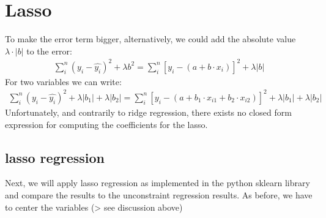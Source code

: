 \documentclass[letterpaper,10pt,english]{jupyterBook}
\begin{document}
\section{Lasso}
\label{\detokenize{Regression_Techniques:lasso}}
\sphinxAtStartPar
To make the error term bigger, alternatively, we could add the absolute value \(\lambda\cdot |b|\) to the error:
\begin{equation*}
\begin{split}\sum_i^{n}(y_i - \hat{y_i})^2 + \lambda b^2= \sum_i^{n}[y_i - (a + b\cdot x_i)]^{2}+ \lambda |b|\end{split}
\end{equation*}
\sphinxAtStartPar
For two variables we can write:
\begin{equation*}
\begin{split}\sum_i^{n}(y_i - \hat{y_i})^2 + \lambda |b_1| + \lambda |b_2|= \sum_i^{n}[y_i - (a + b_1\cdot x_{i1} + b_2\cdot x_{i2})]^{2}+ \lambda |b_1| + \lambda |b_2|\end{split}
\end{equation*}
\sphinxAtStartPar
Unfortunately, and contrarily to ridge regression, there exists no closed form expression for computing the coefficients for the lasso.


\subsection{lasso regression}
\label{\detokenize{Regression_Techniques:lasso-regression}}
\sphinxAtStartPar
Next, we will apply lasso regression as implemented in the python sklearn library and compare the results to the unconstraint regression results.
As before, we have to center the variables (\sphinxhyphen{}> see discussion above)
\end{document}
